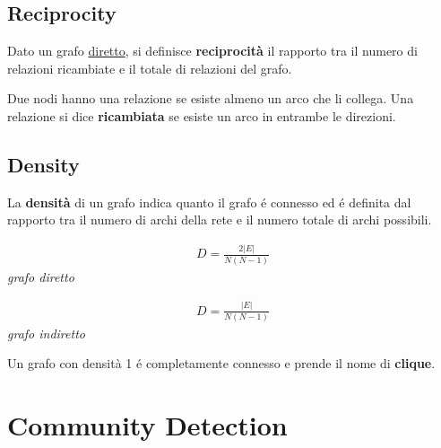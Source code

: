 \subsection*{Reciprocity}
Dato un grafo \underline{diretto}, si definisce \textbf{reciprocità} il rapporto tra il numero di relazioni ricambiate e il totale di relazioni del grafo. 

Due nodi hanno una relazione se esiste almeno un arco che li collega. 
Una relazione si dice \textbf{ricambiata} se esiste un arco in entrambe le direzioni. 

\subsection*{Density}
La \textbf{densità} di un grafo indica quanto il grafo é connesso ed é definita dal rapporto tra il numero di archi della rete e il numero totale di archi possibili.
\\
\begin{minipage}{0.45\textwidth}
  \centering
  \begin{align*}
    D = \frac{2|E|}{N (N - 1)}
  \end{align*}
  \small\textit{grafo diretto}
\end{minipage}
\hfill
\begin{minipage}{0.45\textwidth}
  \centering
  \begin{align*}
    D = \frac{|E|}{N (N - 1)}
  \end{align*}
  \small\textit{grafo indiretto}
\end{minipage}

Un grafo con densità 1 é completamente connesso e prende il nome di \textbf{clique}.

\section{Community Detection}

